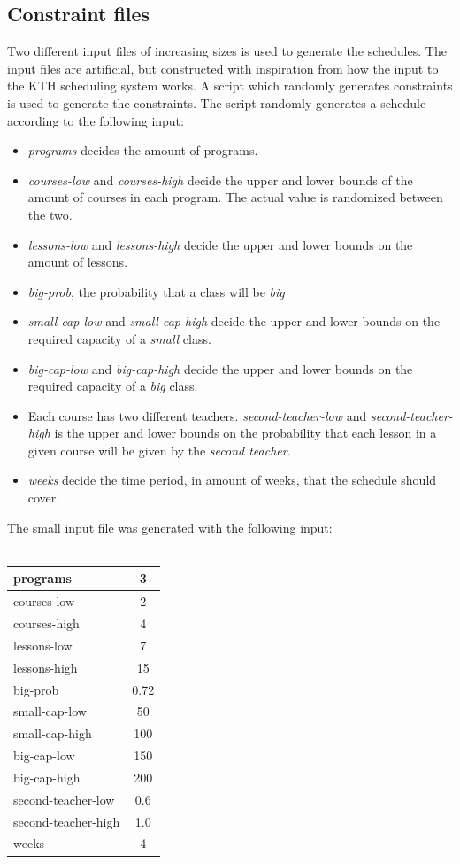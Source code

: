 \documentclass[titlepage,a4paper]{article}
\begin{document}
\subsection{Constraint files}
Two different input files of increasing sizes is used to generate the schedules. The input files are artificial, but constructed with inspiration from how the input to the KTH scheduling system works.
A script which randomly generates constraints is used to generate the constraints. The script randomly generates a schedule according to the following input:
\begin{itemize}
  \item \emph{programs} decides the amount of programs.
  \item \emph{courses-low} and \emph{courses-high} decide the upper and lower bounds of the amount of courses in each program. The actual value is randomized between the two.
  \item \emph{lessons-low} and \emph{lessons-high} decide the upper and lower bounds on the amount of lessons.
  \item \emph{big-prob}, the probability that a class will be \emph{big}
  \item \emph{small-cap-low} and \emph{small-cap-high} decide the upper and lower bounds on the required capacity of a \emph{small} class.
  \item \emph{big-cap-low} and \emph{big-cap-high} decide the upper and lower bounds on the required capacity of a \emph{big} class.
  \item Each course has two different teachers. \emph{second-teacher-low} and \emph{second-teacher-high} is the upper and lower bounds on the probability that each lesson in a given course will be given by the \emph{second teacher}.
  \item \emph{weeks} decide the time period, in amount of weeks, that the schedule should cover.
\end{itemize} 
The small input file was generated with the following input: \\\\
\medskip
\begin{tabular}{| l | c |}
  \hline
  programs & 3 \\
  \hline
  courses-low & 2 \\
  \hline
  courses-high & 4 \\
  \hline
  lessons-low & 7 \\
  \hline  
  lessons-high & 15 \\
  \hline  
  big-prob & 0.72 \\
  \hline  
  small-cap-low & 50 \\
  \hline  
  small-cap-high & 100 \\
  \hline  
  big-cap-low & 150 \\
  \hline  
  big-cap-high & 200 \\
  \hline  
  second-teacher-low & 0.6 \\
  \hline  
  second-teacher-high & 1.0 \\
  \hline
  weeks & 4 \\
  \hline
\end{tabular}
\end{document}
